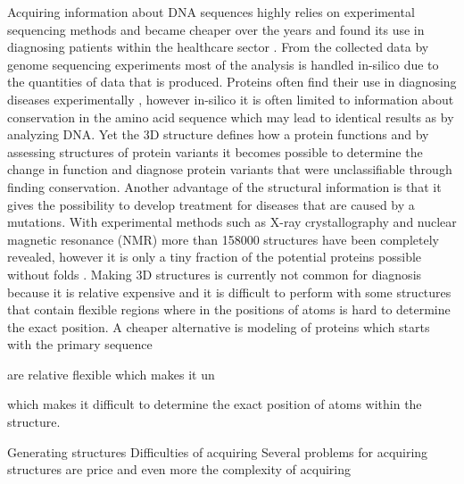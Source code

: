 Acquiring information about DNA sequences highly relies on experimental sequencing methods and became cheaper over the years \cite{} and found its use in diagnosing patients within the healthcare sector \cite{}.
From the collected data by genome sequencing experiments most of the analysis is handled in-silico due to the quantities of data that is produced. Proteins often find their use in diagnosing diseases experimentally \cite{}, however in-silico it is often limited to information about conservation in the amino acid sequence which may lead to identical results as by analyzing DNA.
Yet the 3D structure defines how a protein functions \cite{} and by assessing structures of protein variants it becomes possible to determine the change in function and diagnose protein variants that were unclassifiable through finding conservation.
Another advantage of the structural information is that it gives the possibility to develop treatment for diseases that are caused by a mutations. 
With experimental methods such as X-ray crystallography and nuclear magnetic resonance (NMR) more than 158000 structures \cite{} have been completely revealed, however it is only a tiny fraction of the potential proteins possible without folds \cite{}.
Making 3D structures is currently not common for diagnosis because it is relative expensive and it is difficult to perform with some structures that contain flexible regions where in the positions of atoms is hard to determine the exact position.
A cheaper alternative is modeling of proteins which starts with the primary sequence 



 are relative flexible which makes it un

which makes it difficult to determine the exact position of atoms within the structure.

Generating structures 
Difficulties of acquiring
Several problems for acquiring structures are price and even more the complexity of acquiring 

